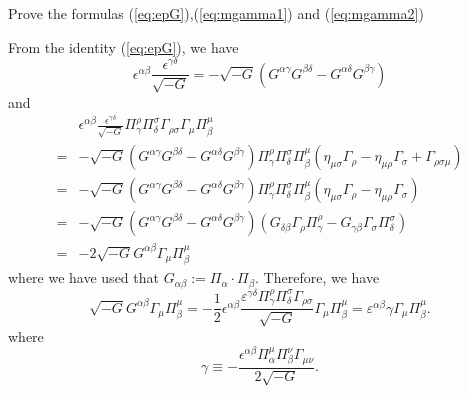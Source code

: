 \documentclass[graybox,envcountchap,sectrefs]{svmono}
\begin{document}
\begin{exercise}
Prove the formulas (\ref{eq:epG}),(\ref{eq:mgamma1}) and (\ref{eq:mgamma2})
\end{exercise}

From the identity (\ref{eq:epG}), we have
\begin{equation}
\epsilon^{\alpha \beta} \frac{\epsilon^{\gamma \delta}}{\sqrt{-G}}=-\sqrt{-G}\left(G^{\alpha \gamma} G^{\beta \delta}-G^{\alpha \delta} G^{\beta \gamma}\right)
\end{equation}
and
\begin{equation}
\begin{aligned}
& \epsilon^{\alpha \beta} \frac{\epsilon^{\gamma \delta}}{\sqrt{-G}} \Pi_{\gamma}^{\rho} \Pi_{\delta}^{\sigma} \Gamma_{\rho \sigma} \Gamma_{\mu} \Pi_{\beta}^{\mu} \\
=&-\sqrt{-G}\left(G^{\alpha \gamma} G^{{\beta} \delta}-G^{\alpha \delta} G^{\beta \gamma}\right) \Pi_{\gamma}^{\rho} \Pi_{\delta}^{\sigma} \Pi_{\beta}^{\mu}\left(\eta_{\mu \sigma} \Gamma_{\rho}-\eta_{\mu \rho} \Gamma_{\sigma}+\Gamma_{\rho \sigma \mu}\right) \\
=&-\sqrt{-G}\left(G^{\alpha \gamma} G^{\beta \delta}-G^{\alpha \delta} G^{\beta \gamma}\right) \Pi_{\gamma}^{\rho} \Pi_{\delta}^{\sigma} \Pi_{\beta}^{\mu}\left(\eta_{\mu \sigma} \Gamma_{\rho}-\eta_{\mu \rho} \Gamma_{\sigma}\right) \\
=&-\sqrt{-G}\left(G^{\alpha \gamma} G^{\beta \delta}-G^{\alpha \delta} G^{\beta \gamma}\right)\left(G_{\delta \beta} \Gamma_{\rho} \Pi_{\gamma}^{\rho}-G_{\gamma \beta} \Gamma_{\sigma} \Pi_{\delta}^{\sigma}\right) \\
=&-2 \sqrt{-G} G^{\alpha \beta} \Gamma_{\mu} \Pi_{\beta}^{\mu}
\end{aligned}
\end{equation}
where we have used that $G_{\alpha\beta}:=\Pi_{\alpha}\cdot\Pi_{\beta}$.
Therefore, we have
\begin{equation}
	\sqrt{-G} G^{\alpha \beta} \Gamma_{\mu} \Pi_{\beta}^{\mu}=-\frac{1}{2}\epsilon^{\alpha \beta} \frac{\varepsilon^{\gamma \delta}\Pi_{\gamma}^{\rho} \Pi_{\delta}^{\sigma} \Gamma_{\rho \sigma} }{\sqrt{-G}} \Gamma_{\mu} \Pi_{\beta}^{\mu} =\varepsilon^{\alpha\beta}\gamma\Gamma_{\mu} \Pi_{\beta}^{\mu}.
\end{equation}
where
\begin{equation}
\gamma \equiv-\frac{\epsilon^{\alpha \beta} \Pi_{\alpha}^{\mu} \Pi_{\beta}^{\nu} \Gamma_{\mu \nu}}{2 \sqrt{-G}}.
\end{equation}
\end{document}
